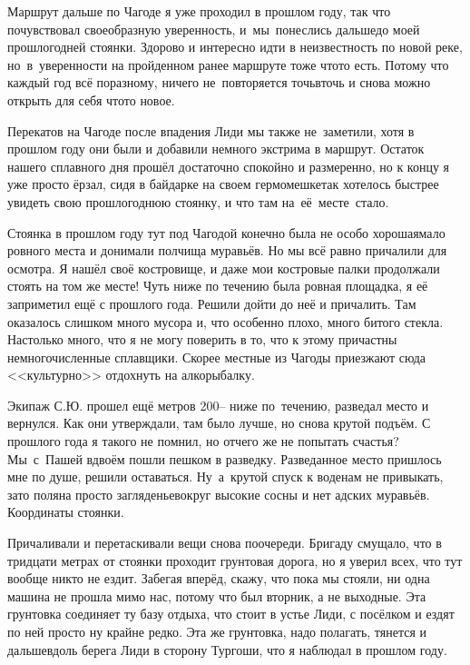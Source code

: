 Маршрут дальше по Чагоде я уже проходил в прошлом году, так что почувствовал своеобразную уверенность, и~мы~понеслись дальше\mdash  до моей прошлогодней стоянки. Здорово и интересно идти в неизвестность по новой реке, но~в~уверенности на пройденном ранее маршруте тоже что\sdash то есть. Потому что каждый год всё по\sdash разному, ничего не~повторяется точь\sdash в\sdash точь и снова можно открыть для себя что\sdash то новое. 
 
Перекатов на Чагоде после впадения Лиди мы также не~заметили, хотя в прошлом году они были и добавили немного экстрима в маршрут. Остаток нашего сплавного дня прошёл достаточно спокойно и размеренно, но к концу я уже просто ёрзал, сидя в байдарке на своем гермомешке\mdash  так хотелось быстрее увидеть свою прошлогоднюю стоянку, и что там на~её~месте~стало. 

Стоянка в прошлом году тут под Чагодой конечно была не особо хорошая\mdash  мало ровного места и донимали полчища муравьёв. Но мы всё равно причалили для осмотра. Я нашёл своё костровище, и даже мои костровые палки продолжали стоять на том же месте! Чуть ниже по течению была ровная площадка, я её заприметил ещё с прошлого года. Решили дойти до неё и причалить. Там оказалось слишком много мусора и, что особенно плохо, много битого стекла. Настолько много, что я не могу поверить в то, что к этому причастны немногочисленные сплавщики. Скорее местные из Чагоды приезжают сюда <<культурно>> отдохнуть на алкорыбалку. 

Экипаж С.Ю. прошел ещё метров 200\thinspace\nobreakdash-- ниже по~течению, разведал место и вернулся. Как они утверждали, там было лучше, но снова крутой подъём. С прошлого года я такого не помнил, но отчего же не попытать счастья? Мы~с~Пашей вдвоём пошли пешком в разведку. Разведанное место пришлось мне по душе, решили оставаться. Ну~а~крутой спуск к воде\mdash  нам не привыкать, зато поляна просто загляденье\mdash  вокруг высокие сосны и нет адских муравьёв. Координаты стоянки\mdash \CoordsChagodaSixteenDrunk.

Причаливали и перетаскивали вещи снова по\sdash очереди. Бригаду смущало, что в тридцати метрах от стоянки проходит грунтовая дорога, но я уверил всех, что тут вообще никто не ездит. Забегая вперёд, скажу, что пока мы стояли, ни одна машина не прошла мимо нас, потому что был вторник, а не выходные. Эта грунтовка соединяет ту базу отдыха, что стоит в устье Лиди, с посёлком и ездят по ней просто ну крайне редко. Эта же грунтовка, надо полагать, тянется и дальше\mdash вдоль берега Лиди в сторону Тургоши, что я наблюдал в прошлом году.

